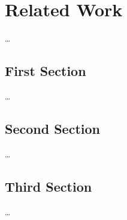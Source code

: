 \chapter{Related Work}
\label{ch:Related_Work}

\dots

\section{First Section}
\label{sec:Related_Work:FirstSection}

\dots

\section{Second Section}
\label{sec:Related_Work:SecondSection}

\dots

\section{Third Section}
\label{sec:Related_Work:ThirdSection}

\dots
